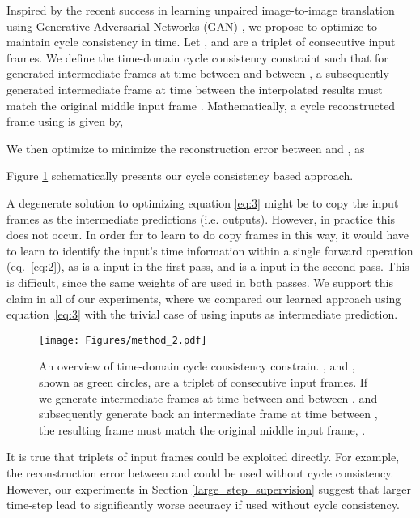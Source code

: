 \documentclass[10pt,twocolumn,letterpaper]{article}
\begin{document}
Inspired by the recent success in learning unpaired image-to-image translation using Generative Adversarial Networks (GAN)  \cite{zhu2017unpaired}, we propose to optimize  to maintain cycle consistency in time. Let  ,  and  are a triplet of consecutive input frames. We define the time-domain cycle consistency constraint such that for generated intermediate frames at time  between  and between , a subsequently generated intermediate frame at time  between the interpolated results  must match the original middle input frame . Mathematically, a cycle reconstructed frame using  is given by, 


We then optimize  to minimize the reconstruction error between  and , as

\noindent Figure \ref{fig:cycle_consistency_figure} schematically presents our cycle consistency based approach.

A degenerate solution to optimizing equation \ref{eq:3} might be to copy the input frames as the intermediate predictions (i.e. outputs). However, in practice this does not occur. In order for  to learn to do copy frames in this way, it would have to learn to identify the input's time information within a single forward operation (eq.~\ref{eq:2}), as  is a  input in the first pass, and  is a  input in the second pass. This is difficult, since the same weights of  are used in both passes. We support this claim in all of our experiments, where we compared our learned approach using equation~\ref{eq:3} with the trivial case of using inputs as intermediate prediction.


\begin{figure}[t]
\centering
\texttt{[image: Figures/method\_2.pdf]}
\caption{An overview of time-domain cycle consistency constrain. ,  and , shown as green circles, are a triplet of consecutive input frames. If we generate intermediate frames at time  between  and between , and subsequently generate back an intermediate frame at time  between , the resulting frame must match the original middle input frame, .}
\label{fig:cycle_consistency_figure}
\end{figure}



It is true that triplets of input frames could be exploited directly. For example, the reconstruction error between  and  could be used without cycle consistency. However, our experiments in Section \ref{large_step_supervision} suggest that larger time-step lead to significantly worse accuracy if used without cycle consistency. 
\end{document}
